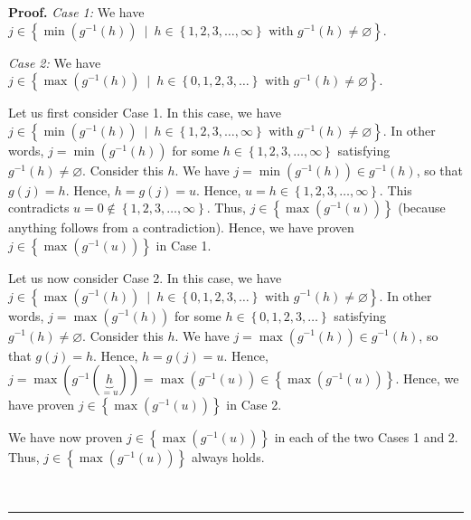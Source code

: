 \documentclass[numbers=enddot,12pt,final,onecolumn,notitlepage]{scrartcl}%
\theoremstyle{definition}
\newenvironment{proof}[1][Proof]{\noindent\textbf{#1.} }{\ \rule{0.5em}{0.5em}}
\newenvironment{verlong}{}{}
\begin{document}
\begin{verlong}
\begin{proof}
\textit{Case 1:} We have $j\in\left\{  \min\left(  g^{-1}\left(  h\right)
\right)  \ \mid\ h\in\left\{  1,2,3,\ldots,\infty\right\}  \text{ with }%
g^{-1}\left(  h\right)  \neq\varnothing\right\}  $.

\textit{Case 2:} We have $j\in\left\{  \max\left(  g^{-1}\left(  h\right)
\right)  \ \mid\ h\in\left\{  0,1,2,3,\ldots\right\}  \text{ with }%
g^{-1}\left(  h\right)  \neq\varnothing\right\}  $.

Let us first consider Case 1. In this case, we have \newline$j\in\left\{
\min\left(  g^{-1}\left(  h\right)  \right)  \ \mid\ h\in\left\{
1,2,3,\ldots,\infty\right\}  \text{ with }g^{-1}\left(  h\right)
\neq\varnothing\right\}  $. In other words, $j=\min\left(  g^{-1}\left(
h\right)  \right)  $ for some $h\in\left\{  1,2,3,\ldots,\infty\right\}  $
satisfying $g^{-1}\left(  h\right)  \neq\varnothing$. Consider this $h$. We
have $j=\min\left(  g^{-1}\left(  h\right)  \right)  \in g^{-1}\left(
h\right)  $, so that $g\left(  j\right)  =h$. Hence, $h=g\left(  j\right)
=u$. Hence, $u=h\in\left\{  1,2,3,\ldots,\infty\right\}  $. This contradicts
$u=0\notin\left\{  1,2,3,\ldots,\infty\right\}  $. Thus, $j\in\left\{
\max\left(  g^{-1}\left(  u\right)  \right)  \right\}  $ (because anything
follows from a contradiction). Hence, we have proven $j\in\left\{  \max\left(
g^{-1}\left(  u\right)  \right)  \right\}  $ in Case 1.

Let us now consider Case 2. In this case, we have \newline$j\in\left\{
\max\left(  g^{-1}\left(  h\right)  \right)  \ \mid\ h\in\left\{
0,1,2,3,\ldots\right\}  \text{ with }g^{-1}\left(  h\right)  \neq
\varnothing\right\}  $. In other words, $j=\max\left(  g^{-1}\left(  h\right)
\right)  $ for some $h\in\left\{  0,1,2,3,\ldots\right\}  $ satisfying
$g^{-1}\left(  h\right)  \neq\varnothing$. Consider this $h$. We have
$j=\max\left(  g^{-1}\left(  h\right)  \right)  \in g^{-1}\left(  h\right)  $,
so that $g\left(  j\right)  =h$. Hence, $h=g\left(  j\right)  =u$. Hence,
$j=\max\left(  g^{-1}\left(  \underbrace{h}_{=u}\right)  \right)  =\max\left(
g^{-1}\left(  u\right)  \right)  \in\left\{  \max\left(  g^{-1}\left(
u\right)  \right)  \right\}  $. Hence, we have proven $j\in\left\{
\max\left(  g^{-1}\left(  u\right)  \right)  \right\}  $ in Case 2.

We have now proven $j\in\left\{  \max\left(  g^{-1}\left(  u\right)  \right)
\right\}  $ in each of the two Cases 1 and 2. Thus, $j\in\left\{  \max\left(
g^{-1}\left(  u\right)  \right)  \right\}  $ always holds.


\end{proof}
\end{verlong}
\end{document}
